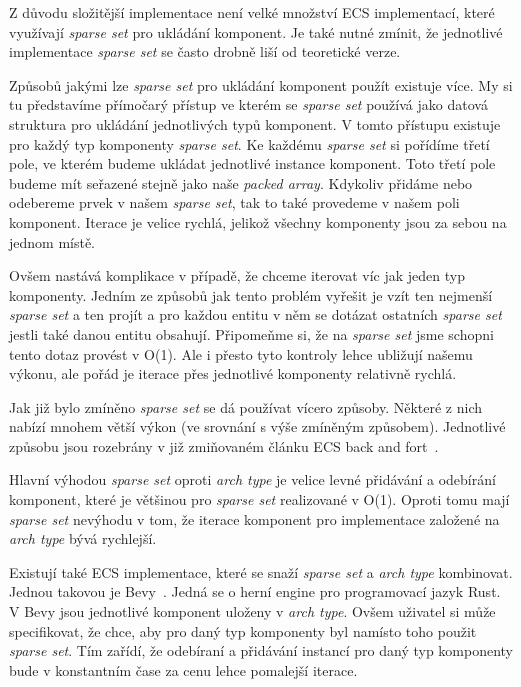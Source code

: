 
Z důvodu složitější implementace není velké množství ECS implementací, které využívají \textit{sparse set} pro ukládání komponent. Je také nutné zmínit, že jednotlivé implementace \textit{sparse set} se často drobně liší od teoretické verze.

Způsobů jakými lze \textit{sparse set} pro ukládání komponent použít existuje více. My si tu představíme přímočarý přístup ve kterém se \textit{sparse set} používá jako datová struktura pro ukládání jednotlivých typů komponent. V tomto přístupu existuje pro každý typ komponenty \textit{sparse set}. Ke každému \textit{sparse set} si pořídíme třetí pole, ve kterém budeme ukládat jednotlivé instance komponent. Toto třetí pole budeme mít seřazené stejně jako naše \textit{packed array}. Kdykoliv přidáme nebo odebereme prvek v našem \textit{sparse set}, tak to také provedeme v našem poli komponent. Iterace je velice rychlá, jelikož všechny komponenty jsou za sebou na jednom místě.

Ovšem nastává komplikace v případě, že chceme iterovat víc jak jeden typ komponenty. Jedním ze způsobů jak tento problém vyřešit je vzít ten nejmenší \textit{sparse set} a ten projít a pro každou entitu v něm se dotázat ostatních \textit{sparse set} jestli také danou entitu obsahují. Připomeňme si, že na \textit{sparse set} jsme schopni tento dotaz provést v O(1). Ale i přesto tyto kontroly lehce ubližují našemu výkonu, ale pořád je iterace přes jednotlivé komponenty relativně rychlá.

Jak již bylo zmíněno \textit{sparse set} se dá používat vícero způsoby. Některé z nich nabízí mnohem větší výkon (ve srovnání s výše zmíněným způsobem). Jednotlivé způsobu jsou rozebrány v již zmiňovaném článku ECS back and fort~\cite{Caini_2019}.

Hlavní výhodou \textit{sparse set} oproti \textit{arch type} je velice levné přidávání a odebírání komponent, které je většinou pro \textit{sparse set} realizované v O(1). Oproti tomu mají \textit{sparse set} nevýhodu v tom, že iterace komponent pro implementace založené na \textit{arch type} bývá rychlejší.

Existují také ECS implementace, které se snaží \textit{sparse set} a \textit{arch type} kombinovat. Jednou takovou je Bevy~\cite{Bevy}. Jedná se o herní engine pro programovací jazyk Rust. V Bevy jsou jednotlivé komponent uloženy v \textit{arch type}. Ovšem uživatel si může specifikovat, že chce, aby pro daný typ komponenty byl namísto toho použit \textit{sparse set}. Tím zařídí, že odebíraní a přidávání instancí pro daný typ komponenty bude v konstantním čase za cenu lehce pomalejší iterace.

